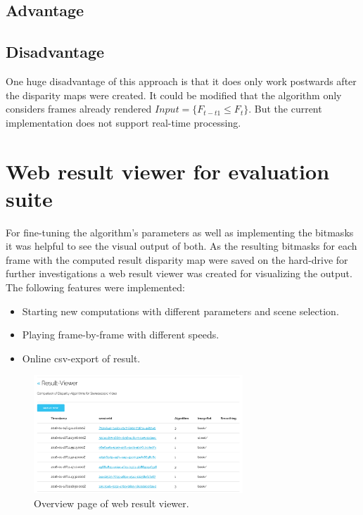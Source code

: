 \subsection*{Advantage}



\subsection*{Disadvantage}

\noindent One huge disadvantage of this approach is that it does only work postwards after the disparity maps were created.
It could be modified that the algorithm only considers frames already rendered $Input = \{ F_{t-t1} \le F_{t} \}$.
But the current implementation does not support real-time processing.

\section{Web result viewer for evaluation suite}

For fine-tuning the algorithm's parameters as well as implementing the bitmasks it was helpful to see the visual output of both.
As the resulting bitmasks for each frame with the computed result disparity map were saved on the hard-drive for further investigations a web result viewer was created for visualizing the output.
The following features were implemented:
\begin{itemize}
  \item Starting new computations with different parameters and scene selection.
  \item Playing frame-by-frame with different speeds.
  \item Online csv-export of result.
\end{itemize}

\begin{figure}[p!]
  \centering
  \includegraphics[angle=90,width=0.7\textwidth]{src/images/result-viewer-overview.png}
  \caption{Overview page of web result viewer.}
  \label{fig:web-overview}
\end{figure}

